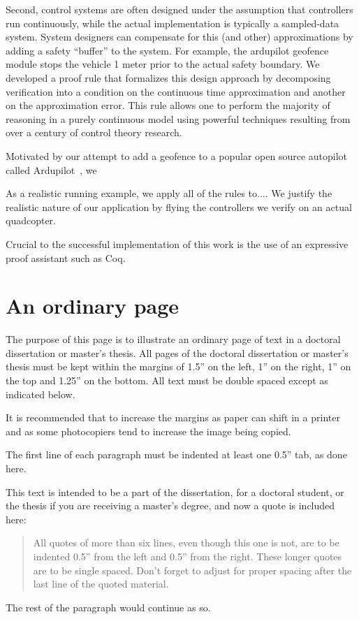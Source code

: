 \documentclass[12pt]{ucsddissertation}
\begin{document}
\begin{dissertationintroduction}
Second, control systems are often designed under the assumption that
controllers run continuously, while the actual implementation is typically
a sampled-data system. System designers can compensate for this (and other)
approximations by adding a safety ``buffer'' to the system. For example,
the ardupilot geofence module stops the vehicle 1 meter prior to the actual
safety boundary. We developed a proof rule that formalizes this design
approach by decomposing verification into a condition on the continuous
time approximation and another on the approximation error.  This rule
allows one to perform the majority of reasoning in a purely continuous
model using powerful techniques resulting from over a century of control
theory research.

Motivated by our attempt to add a geofence to a popular open
source autopilot called Ardupilot~\cite{???}, we

As a realistic running example, we apply all of the rules to.... We justify
the realistic nature of our application by flying the controllers we verify
on an actual quadcopter.

Crucial to the successful implementation of this work is the use of an
expressive proof assistant such as Coq.

\end{dissertationintroduction}

\chapter{An ordinary page}
The purpose of this page is to illustrate an ordinary page of text in
a doctoral dissertation or master's thesis. All pages of the doctoral
dissertation or master's thesis must be kept within the margins of
1.5'' on the left, 1'' on the right, 1'' on the top and 1.25'' on the
bottom. All text must be double spaced except as indicated below.

It is recommended that to increase the margins as paper can shift in a
printer and as some photocopiers tend to increase the image being
copied.

The first line of each paragraph must be indented at least one 0.5''
tab, as done here.

This text is intended to be a part of the dissertation, for a doctoral
student, or the thesis if you are receiving a master's degree, and now
a quote is included here:
\begin{quote}
All quotes of more than six lines, even though this one is not, are to
be indented 0.5'' from the left and 0.5'' from the right. These longer
quotes are to be single spaced. Don't forget to adjust for proper
spacing after the last line of the quoted material.
\end{quote}
The rest of the paragraph would continue as so.
\end{document}

